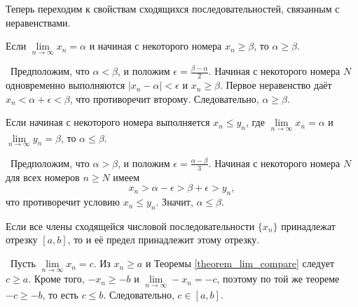 Теперь переходим к свойствам сходящихся последовательностей, связанным с неравенствами.

\begin{theorem} \label{theorem_lim_compare}
Если \(\lim\limits_{n \to \infty}x_{n} = \alpha\) и начиная с некоторого
номера \(x_{n} \geq \beta\), то \(\alpha \geq \beta\).

\vspace{2mm}

\proofname~Предположим, что \(\alpha < \beta\), и положим
\(\epsilon = \frac{\beta - \alpha}{2}\). Начиная с некоторого
номера \(N\) одновременно выполняются \(|x_{n} - \alpha| < \epsilon\)
и \(x_{n} \geq \beta\). Первое неравенство даёт
\(x_{n} < \alpha + \epsilon < \beta\), что противоречит второму.
Следовательно, \(\alpha \geq \beta\).~\qedsymbol
\end{theorem}

\begin{theorem}
Если начиная с некоторого номера выполняется \(x_{n} \leq y_{n}\),
где \({\lim\limits_{n \to \infty}x_{n} = \alpha}\) и
\(\lim\limits_{n \to \infty} y_{n} = \beta\), то \(\alpha \leq \beta\).

\vspace{2mm}

\proofname~Предположим, что \(\alpha > \beta\), и положим
\(\epsilon = \frac{\alpha - \beta}{3}\). Начиная с некоторого номера \(N\)
для всех номеров \(n \geq N\) имеем
\[
x_{n} > \alpha - \epsilon > \beta + \epsilon > y_{n},
\]
что противоречит условию \(x_{n} \leq y_{n}\). Значит, \(\alpha \leq \beta\).~\qedsymbol
\end{theorem}

\begin{theorem}
Если все члены сходящейся числовой последовательности \(\{x_{n}\}\)
принадлежат отрезку \([a,b]\), то и её предел принадлежит этому
отрезку.

\vspace{2mm}

\proofname~Пусть \(\lim\limits_{n \to \infty} x_{n} = c\). Из \(x_{n} \geq a\) и
Теоремы \ref{theorem_lim_compare} следует \(c \geq a\). Кроме того, \( -x_{n} \geq -b\) и
\(\lim\limits_{n \to \infty} -x_{n} = -c\), поэтому по той же теореме \(-c \geq -b\),
то есть \(c \leq b\). Следовательно, \(c \in [a,b]\).~\qedsymbol
\end{theorem}


